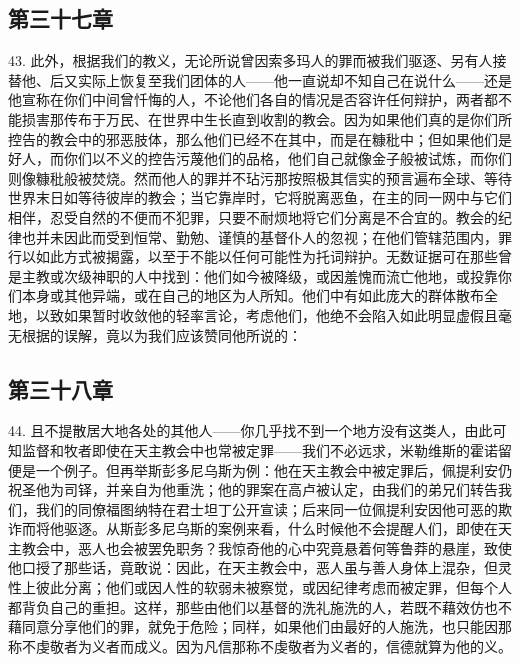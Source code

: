 
\subsection{第三十七章}

43. 此外，根据我们的教义，无论所说曾因索多玛人的罪而被我们驱逐、另有人接替他、后又实际上恢复至我们团体的人——他一直说却不知自己在说什么——还是他宣称在你们中间曾忏悔的人，不论他们各自的情况是否容许任何辩护，两者都不能损害那传布于万民、在世界中生长直到收割的教会。因为如果他们真的是你们所控告的教会中的邪恶肢体，那么他们已经不在其中，而是在糠秕中；但如果他们是好人，而你们以不义的控告污蔑他们的品格，他们自己就像金子般被试炼，而你们则像糠秕般被焚烧。然而他人的罪并不玷污那按照极其信实的预言遍布全球、等待世界末日如等待彼岸的教会；当它靠岸时，它将脱离恶鱼，在主的同一网中与它们相伴，忍受自然的不便而不犯罪，只要不耐烦地将它们分离是不合宜的。教会的纪律也并未因此而受到恒常、勤勉、谨慎的基督仆人的忽视；在他们管辖范围内，罪行以如此方式被揭露，以至于不能以任何可能性为托词辩护。无数证据可在那些曾是主教或次级神职的人中找到：他们如今被降级，或因羞愧而流亡他地，或投靠你们本身或其他异端，或在自己的地区为人所知。他们中有如此庞大的群体散布全地，以致如果暂时收敛他的轻率言论，考虑他们，他绝不会陷入如此明显虚假且毫无根据的误解，竟以为我们应该赞同他所说的：\par


\subsection{第三十八章}

44. 且不提散居大地各处的其他人——你几乎找不到一个地方没有这类人，由此可知监督和牧者即使在天主教会中也常被定罪——我们不必远求，米勒维斯的霍诺留便是一个例子。但再举斯彭多尼乌斯为例：他在天主教会中被定罪后，佩提利安仍祝圣他为司铎，并亲自为他重洗；他的罪案在高卢被认定，由我们的弟兄们转告我们，我们的同僚福图纳特在君士坦丁公开宣读；后来同一位佩提利安因他可恶的欺诈而将他驱逐。从斯彭多尼乌斯的案例来看，什么时候他不会提醒人们，即使在天主教会中，恶人也会被罢免职务？我惊奇他的心中究竟悬着何等鲁莽的悬崖，致使他口授了那些话，竟敢说：因此，在天主教会中，恶人虽与善人身体上混杂，但灵性上彼此分离；他们或因人性的软弱未被察觉，或因纪律考虑而被定罪，但每个人都背负自己的重担。这样，那些由他们以基督的洗礼施洗的人，若既不藉效仿也不藉同意分享他们的罪，就免于危险；同样，如果他们由最好的人施洗，也只能因那称不虔敬者为义者而成义。因为凡信那称不虔敬者为义者的，信德就算为他的义。\par

